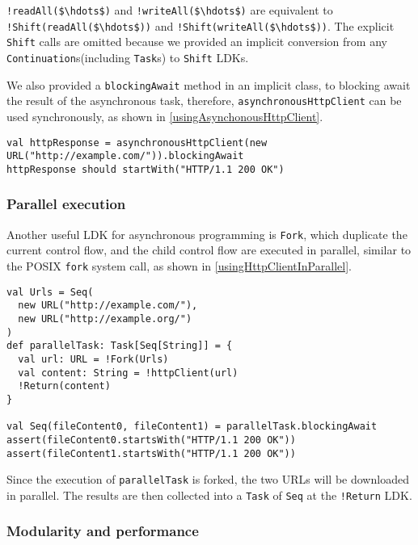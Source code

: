 \lstinline[mathescape=true]{!readAll($\hdots$)} and \lstinline[mathescape=true]{!writeAll($\hdots$)} are equivalent to \lstinline[mathescape=true]{!Shift(readAll($\hdots$))} and \lstinline[mathescape=true]{!Shift(writeAll($\hdots$))}. The explicit \lstinline{Shift} calls are omitted because we provided an implicit conversion from any \lstinline{Continuation}s(including \lstinline{Task}s) to \lstinline{Shift} LDKs.

We also provided a \lstinline{blockingAwait} method in an implicit class, to blocking await the result of the asynchronous task, therefore, \lstinline{asynchronousHttpClient} can be used synchronously, as shown in \cref{usingAsynchonousHttpClient}.

\begin{lstlisting}[caption={Using the example HTTP client},label={usingAsynchonousHttpClient}]
val httpResponse = asynchronousHttpClient(new URL("http://example.com/")).blockingAwait
httpResponse should startWith("HTTP/1.1 200 OK")
\end{lstlisting}

\subsubsection{Parallel execution}\label{Parallel execution}

Another useful LDK for asynchronous programming is \lstinline{Fork}, which duplicate the current control flow, and the child control flow are executed in parallel, similar to the POSIX \lstinline{fork} system call, as shown in \cref{usingHttpClientInParallel}.

\begin{lstlisting}[caption={Using HTTP client in parallel},label={usingHttpClientInParallel}]
val Urls = Seq(
  new URL("http://example.com/"),
  new URL("http://example.org/")
)
def parallelTask: Task[Seq[String]] = {
  val url: URL = !Fork(Urls)
  val content: String = !httpClient(url)
  !Return(content)
}

val Seq(fileContent0, fileContent1) = parallelTask.blockingAwait
assert(fileContent0.startsWith("HTTP/1.1 200 OK"))
assert(fileContent1.startsWith("HTTP/1.1 200 OK"))
\end{lstlisting}

Since the execution of \lstinline{parallelTask} is forked, the two URLs will be downloaded in parallel. The results are then collected into a \lstinline{Task} of \lstinline{Seq} at the \lstinline{!Return} LDK.

\subsubsection{Modularity and performance}

